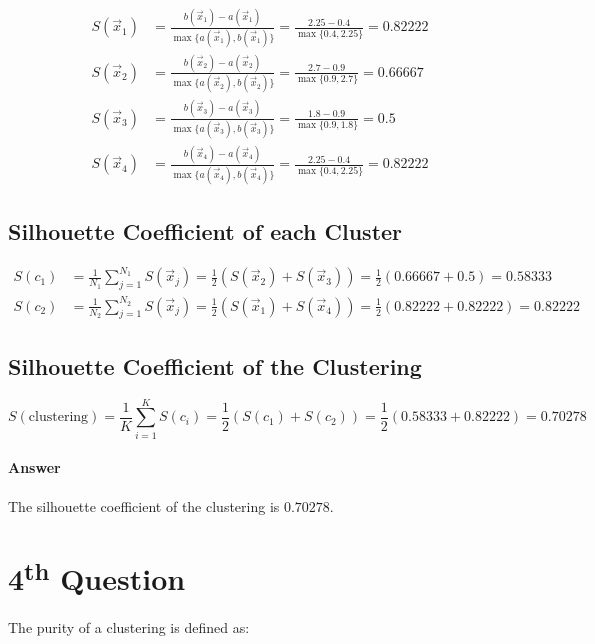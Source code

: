\documentclass{article}
\begin{document}
\begin{align*}
  S(\vec{x}_1) &= \frac{b(\vec{x}_1) - a(\vec{x}_1)}{\max \{ a(\vec{x}_1), b(\vec{x}_1) \}} = \frac{2.25 - 0.4}{\max \{ 0.4, 2.25 \}} = 0.82222 \\
  S(\vec{x}_2) &= \frac{b(\vec{x}_2) - a(\vec{x}_2)}{\max \{ a(\vec{x}_2), b(\vec{x}_2) \}} = \frac{2.7 - 0.9}{\max \{ 0.9, 2.7 \}} = 0.66667 \\
  S(\vec{x}_3) &= \frac{b(\vec{x}_3) - a(\vec{x}_3)}{\max \{ a(\vec{x}_3), b(\vec{x}_3) \}} = \frac{1.8 - 0.9}{\max \{ 0.9, 1.8 \}} = 0.5 \\
  S(\vec{x}_4) &= \frac{b(\vec{x}_4) - a(\vec{x}_4)}{\max \{ a(\vec{x}_4), b(\vec{x}_4) \}} = \frac{2.25 - 0.4}{\max \{ 0.4, 2.25 \}} = 0.82222
\end{align*}

\subsection*{Silhouette Coefficient of each Cluster}

\begin{align*}
  S(c_1) &= \frac{1}{N_1} \sum_{j=1}^{N_1} S(\vec{x}_j) = \frac{1}{2} ( S(\vec{x}_2) + S(\vec{x}_3) ) = \frac{1}{2} ( 0.66667 + 0.5 ) = 0.58333 \\
  S(c_2) &= \frac{1}{N_2} \sum_{j=1}^{N_2} S(\vec{x}_j) = \frac{1}{2} ( S(\vec{x}_1) + S(\vec{x}_4) ) = \frac{1}{2} ( 0.82222 + 0.82222 ) = 0.82222
\end{align*}

\subsection*{Silhouette Coefficient of the Clustering}

\[ S(\text{clustering}) = \frac{1}{K} \sum_{i=1}^K S(c_i) = \frac{1}{2} ( S(c_1) + S(c_2) ) = \frac{1}{2} ( 0.58333 + 0.82222 ) = 0.70278 \]

\paragraph{Answer} The silhouette coefficient of the clustering is $0.70278$.

\newpage

\section*{4\textsuperscript{th} Question}

The purity of a clustering is defined as:
\end{document}
